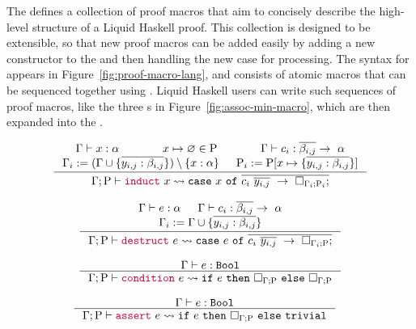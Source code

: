The \LangA defines a collection of proof macros that aim to concisely
describe the high-level structure of a Liquid Haskell proof. This
collection is designed to be extensible, so that new proof macros can
be added easily by adding a new constructor to the \LangA and then
handling the new case for processing.  The syntax for \LangA appears
in Figure~\ref{fig:proof-macro-lang}, and consists of atomic macros
that can be sequenced together using \LC{;}. Liquid Haskell users can
write such sequences of proof macros, like the three s
in Figure~\ref{fig:assoc-min-macro}, which are then expanded into the
\LangB.


\begin{figure*}
  \begin{minipage}{\textwidth}
    \[
    \begin{array}{c}
      \inference{
          \Gamma \vdash x : \alpha &&  x \mapsto \varnothing \in \Rho &&
          \Gamma \vdash c_i : \overline{\beta_{i,j}} \rightarrow ~ \alpha \\
          \Gamma_i := (\Gamma \cup \{\overline{y_{i,j}:\beta_{i,j}}\}) \setminus \{x:\alpha\} && 
          \Rho_i := \Rho[ x \mapsto \{\overline{y_{i,j}:\beta_{i,j}}\} ]
      }
      {\Gamma; \Rho 
  \vdash
  \macro{induct} ~ x
  \expandsTo 
  \MC{case} ~ x ~ \MC{of} ~ 
  \overline{
    c_i ~ \overline{y_{i,j}} ~ \rightarrow ~ 
    \macroHole
      {\Gamma_i}
      {\Rho_i};
  }}\\
  \\
  \inference{\Gamma \vdash e : \alpha &&
    \Gamma \vdash c_i : \overline{\beta_{i,j}} \rightarrow ~ \alpha \\
    \Gamma_i := \Gamma \cup \{\overline{y_{i,j}:\beta_{i,j}}\}
  }
  {\Gamma; \Rho
  \vdash
  \macro{destruct} ~ e
  \expandsTo 
  \MC{case} ~ e ~ \MC{of} ~
  \overline{
    c_i ~ \overline{y_{i,j}} ~ \rightarrow ~ 
    \macroHole
      {\Gamma_i}
      {\Rho};
  }}\\
  \\
  \inference{
    \Gamma \vdash e:\MC{Bool}
  }
  {
  \Gamma; \Rho
  \vdash
  \macro{condition} ~ e
  \expandsTo
  \MC{if} ~ e ~ \MC{then} ~ \macroHole{\Gamma}{\Rho} ~ \MC{else} ~ \macroHole{\Gamma}{\Rho}}\\
  \\
  \inference{
    \Gamma \vdash e:\MC{Bool}
  }
  {\Gamma; \Rho
  \vdash
  \macro{assert} ~ e
  \expandsTo
  \MC{if} ~ e ~ \MC{then} ~ \macroHole{\Gamma}{\Rho} ~ \MC{else} ~ \MC{trivial}} \quad

\end{array}\]
\end{minipage}
\end{figure*}
